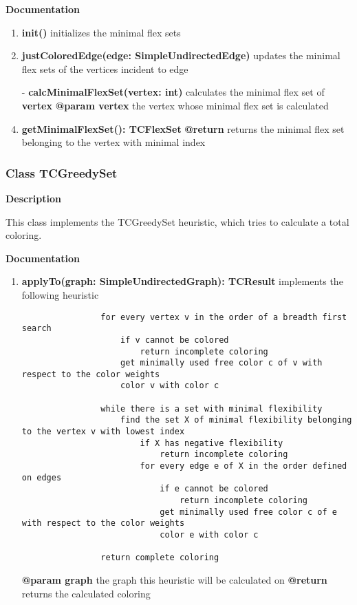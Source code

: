 \documentclass{article}
\newcommand{\myclass}[1]{\subsubsection*{Class #1} \label{#1} \addcontentsline{toc}{subsubsection}{\nameref{#1}}}
\begin{document}
	\textbf{Documentation}
	
	\begin{enumerate}[\#]
		\item{
			\textbf{init()} \newline
			initializes the minimal flex sets
		}
		\item{
			\textbf{justColoredEdge(edge: SimpleUndirectedEdge)} \newline
			updates the minimal flex sets of the vertices incident to edge
		}
		\item[-]{
			\textbf{calcMinimalFlexSet(vertex: int)} \newline
			calculates the minimal flex set of \textbf{vertex} \newline
			\textbf{@param vertex} the vertex whose minimal flex set is calculated
		}
		\item{
			\textbf{getMinimalFlexSet(): TCFlexSet} \newline
			\textbf{@return} returns the minimal flex set belonging to the vertex with minimal index
		}
	\end{enumerate}
	
	\myclass{TCGreedySet}
	
	\textbf{Description}
	
	This class implements the TCGreedySet heuristic, which tries to calculate a total coloring.
	
	\textbf{Documentation}
	
	\begin{enumerate}[+]
		\item{
			\textbf{applyTo(graph: SimpleUndirectedGraph): TCResult} \newline
			implements the following heuristic
			
			\begin{verbatim}
				for every vertex v in the order of a breadth first search
				    if v cannot be colored
				        return incomplete coloring
				    get minimally used free color c of v with respect to the color weights
				    color v with color c
				    
				while there is a set with minimal flexibility
				    find the set X of minimal flexibility belonging to the vertex v with lowest index
				        if X has negative flexibility
				            return incomplete coloring
				        for every edge e of X in the order defined on edges
				            if e cannot be colored
				                return incomplete coloring
				            get minimally used free color c of e with respect to the color weights
				            color e with color c
				        
				return complete coloring
			\end{verbatim}
			
			\textbf{@param graph} the graph this heuristic will be calculated on \newline
			\textbf{@return} returns the calculated coloring
		}
	\end{enumerate}
	
\end{document}
